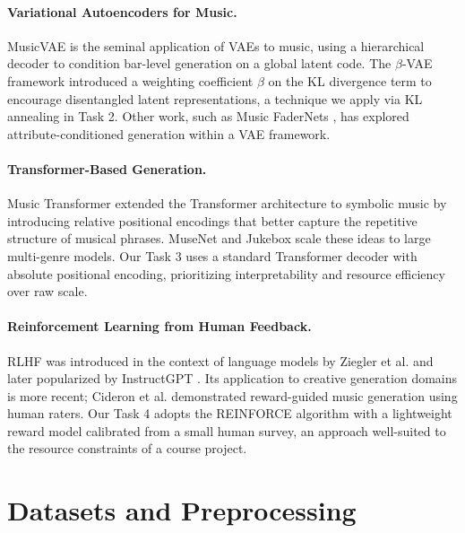 \documentclass{article}
\begin{document}
\paragraph{Variational Autoencoders for Music.}
MusicVAE \cite{roberts2018hierarchical} is the seminal application of VAEs to music, using a hierarchical decoder to condition bar-level generation on a global latent code. The $\beta$-VAE framework \cite{higgins2017beta} introduced a weighting coefficient $\beta$ on the KL divergence term to encourage disentangled latent representations, a technique we apply via KL annealing in Task 2. Other work, such as Music FaderNets \cite{tan2020music}, has explored attribute-conditioned generation within a VAE framework.

\paragraph{Transformer-Based Generation.}
Music Transformer \cite{huang2018music} extended the Transformer architecture \cite{vaswani2017attention} to symbolic music by introducing relative positional encodings that better capture the repetitive structure of musical phrases. MuseNet \cite{payne2019musenet} and Jukebox \cite{dhariwal2020jukebox} scale these ideas to large multi-genre models. Our Task 3 uses a standard Transformer decoder with absolute positional encoding, prioritizing interpretability and resource efficiency over raw scale.

\paragraph{Reinforcement Learning from Human Feedback.}
RLHF was introduced in the context of language models by Ziegler et al. \cite{ziegler2019fine} and later popularized by InstructGPT \cite{ouyang2022training}. Its application to creative generation domains is more recent; Cideron et al. \cite{cideron2024musicrl} demonstrated reward-guided music generation using human raters. Our Task 4 adopts the REINFORCE algorithm \cite{williams1992simple} with a lightweight reward model calibrated from a small human survey, an approach well-suited to the resource constraints of a course project.

\section{Datasets and Preprocessing}
\label{sec:data}
\end{document}
